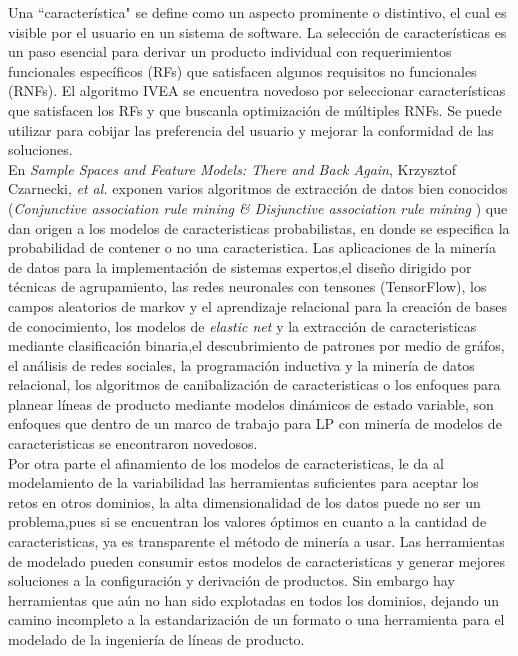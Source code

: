 Una ``característica" se define como un aspecto prominente o distintivo, el cual es visible por el usuario en un sistema de software. La selección de características es un paso esencial para derivar un producto individual con requerimientos funcionales específicos (RFs) que satisfacen algunos requisitos no funcionales (RNFs). El algoritmo IVEA\cite{Lian2015} se encuentra novedoso por seleccionar características  que satisfacen los RFs y que buscanla optimización de múltiples RNFs. Se puede utilizar para cobijar las preferencia del usuario y mejorar la conformidad de las soluciones.\\
En \textit{Sample Spaces and Feature Models: There and Back Again}\cite{Czarnecki2008},  Krzysztof Czarnecki, \textit{et al.} exponen varios algoritmos de extracción de datos bien conocidos (\textit{Conjunctive association rule mining \& Disjunctive association rule mining }) que dan origen a los modelos de caracteristicas probabilistas, en donde se especifica la probabilidad de contener o no una caracteristica. Las aplicaciones de la minería de datos para la implementación de sistemas expertos\cite{Jiao2005},el diseño dirigido por técnicas de agrupamiento\cite{Niu2008}, las redes neuronales con tensones (TensorFlow), los campos aleatorios de markov y el aprendizaje relacional para la creación de bases de conocimiento\cite{Nickel2015}, los modelos de \textit{elastic net}\cite{Zou2005a} y la extracción de caracteristicas mediante clasificación binaria\cite{Wang2012},el descubrimiento de patrones por medio de gráfos\cite{Atzmueller2015a}, el análisis de redes sociales\cite{Atzmueller2015a}, la programación inductiva y la minería de datos relacional\cite{Perovsek2015a},  los algoritmos de canibalización de caracteristicas o los enfoques para planear líneas de producto mediante modelos dinámicos de estado variable\cite{Lin2013}, son enfoques que dentro de un marco de trabajo\cite{Woznica2012} para LP con minería de modelos de caracteristicas se encontraron novedosos.\\
Por otra parte el afinamiento de los modelos  de caracteristicas\cite{Nadi2015,Valov2015}, le da al modelamiento de la variabilidad las herramientas suficientes para aceptar los retos en otros dominios\cite{Chen2014}, la alta dimensionalidad  de los datos puede no ser un problema,pues  si se encuentran los valores óptimos en cuanto a la cantidad de caracteristicas, ya es transparente el método de minería a usar\cite{Valov2015}. Las herramientas de modelado\cite{Bezerra2016,Mazo2015} pueden consumir estos modelos de caracteristicas y generar mejores soluciones a la configuración y derivación de productos. Sin embargo hay herramientas\cite{Nadi2015} que aún no han sido explotadas en todos los dominios, dejando un camino incompleto a la estandarización de un formato o una herramienta para el modelado de la ingeniería de líneas de producto.\\

